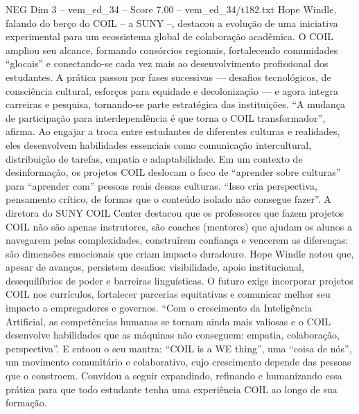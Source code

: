 \begin{textsample}{NEG Dim 3 – vem\_ed\_34 – Score 7.00 – vem\_ed\_34/t182.txt}
Hope Windle, falando do berço do COIL – a SUNY –, destacou a evolução de uma iniciativa experimental para um ecossistema global de colaboração acadêmica.
O COIL ampliou seu alcance, formando consórcios regionais, fortalecendo comunidades “glocais” e conectando-se cada vez mais ao desenvolvimento profissional dos estudantes.
A prática passou por fases sucessivas — desafios tecnológicos, de consciência cultural, esforços para equidade e decolonização — e agora integra carreiras e pesquisa, tornando-se parte estratégica das instituições. “A mudança de participação para interdependência é que torna o COIL transformador”, afirma.
Ao engajar a troca entre estudantes de diferentes culturas e realidades, eles desenvolvem habilidades essenciais como comunicação intercultural, distribuição de tarefas, empatia e adaptabilidade.
Em um contexto de desinformação, os projetos COIL deslocam o foco de “aprender sobre culturas” para “aprender com” pessoas reais dessas culturas. “Isso cria perspectiva, pensamento crítico, de formas que o conteúdo isolado não consegue fazer”.
A diretora do SUNY COIL Center destacou que os professores que fazem projetos COIL não são apenas instrutores, são coaches (mentores) que ajudam os alunos a navegarem pelas complexidades, construírem confiança e vencerem as diferenças: são dimensões emocionais que criam impacto duradouro.
Hope Windle notou que, apesar de avanços, persistem desafios: visibilidade, apoio institucional, desequilíbrios de poder e barreiras linguísticas.
O futuro exige incorporar projetos COIL nos currículos, fortalecer parcerias equitativas e comunicar melhor seu impacto a empregadores e governos. “Com o crescimento da Inteligência Artificial, as competências humanas se tornam ainda mais valiosas e o COIL desenvolve habilidades que as máquinas não conseguem: empatia, colaboração, perspectiva”.
E entoou o seu mantra: “COIL is a WE thing”, uma “coisa de nós”, um movimento comunitário e colaborativo, cujo crescimento depende das pessoas que o constroem.
Convidou a seguir expandindo, refinando e humanizando essa prática para que todo estudante tenha uma experiência COIL ao longo de sua formação.

\end{textsample}
